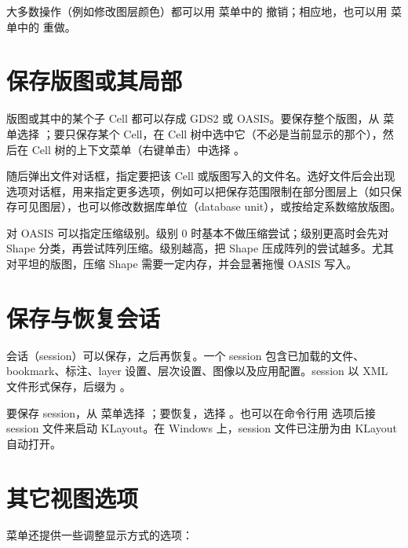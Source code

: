 大多数操作（例如修改图层颜色）都可以用  菜单中的  撤销；相应地，也可以用  菜单中的  重做。

\section{保存版图或其局部}\label{sec:save}

版图或其中的某个子 Cell 都可以存成 GDS2 或 OASIS。要保存整个版图，从  菜单选择 ；要只保存某个 Cell，在 Cell 树中选中它（不必是当前显示的那个），然后在 Cell 树的上下文菜单（右键单击）中选择 。

随后弹出文件对话框，指定要把该 Cell 或版图写入的文件名。选好文件后会出现选项对话框，用来指定更多选项，例如可以把保存范围限制在部分图层上（如只保存可见图层），也可以修改数据库单位（database unit），或按给定系数缩放版图。

对 OASIS 可以指定压缩级别。级别 0 时基本不做压缩尝试；级别更高时会先对 Shape 分类，再尝试阵列压缩。级别越高，把 Shape 压成阵列的尝试越多。尤其对平坦的版图，压缩 Shape 需要一定内存，并会显著拖慢 OASIS 写入。

\section{保存与恢复会话}\label{sec:session}

会话（session）可以保存，之后再恢复。一个 session 包含已加载的文件、bookmark、标注、layer 设置、层次设置、图像以及应用配置。session 以 XML 文件形式保存，后缀为 。

要保存 session，从  菜单选择 ；要恢复，选择 。也可以在命令行用  选项后接 session 文件来启动 KLayout。在 Windows 上，session 文件已注册为由 KLayout 自动打开。

\section{其它视图选项}\label{sec:view_options}

 菜单还提供一些调整显示方式的选项：

